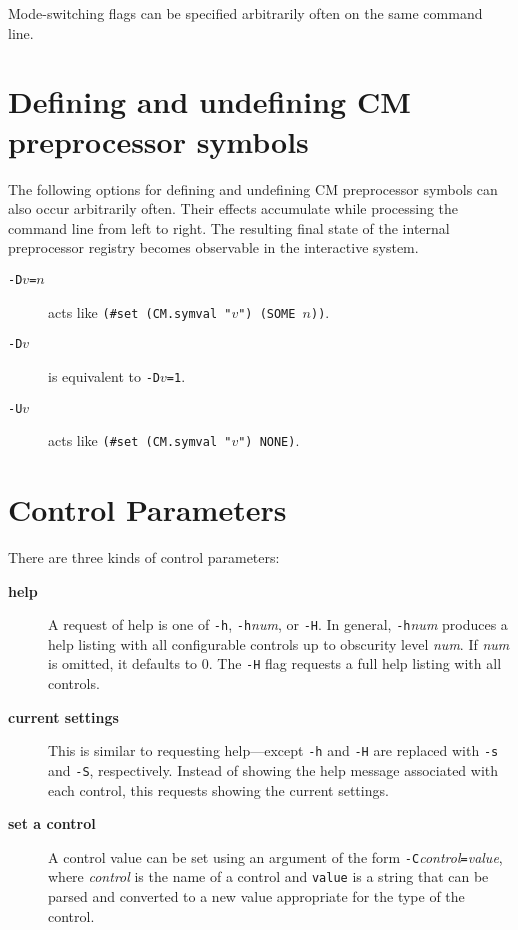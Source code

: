 Mode-switching flags can be specified arbitrarily often on the same
command line.

\section{Defining and undefining CM preprocessor symbols}
\label{sec:cmdline:defundef}

The following options for defining and undefining CM preprocessor
symbols can also occur arbitrarily often.  Their effects accumulate
while processing the command line from left to right.  The resulting
final state of the internal preprocessor registry becomes observable
in the interactive system.

\begin{description}
\item[{\tt -D$v$=$n$}] acts like {\tt (\#set (CM.symval "$v$") (SOME $n$))}.
\item[{\tt -D$v$}] is equivalent to {\tt -D$v$=1}.
\item[{\tt -U$v$}] acts like {\tt (\#set (CM.symval "$v$") NONE)}.
\end{description}

\section{Control Parameters}

There are three kinds of control parameters:

\begin{description}
\item[{\bf help}] A request of help is one of {\tt -h},
{\tt -h}{\it num}, or {\tt -H}.  In general, {\tt -h}{\it num}
produces a help listing with all configurable controls up to obscurity
level {\it num}.  If {\it num} is omitted, it defaults to 0.  The
{\tt -H} flag requests a full help listing with all controls.
\item[{\bf current settings}] This is similar to requesting
help---except {\tt -h} and {\tt -H} are replaced with {\tt -s} and
{\tt -S}, respectively.  Instead of showing the help message
associated with each control, this requests showing the current
settings.
\item[{\bf set a control}] A control value can be set using an
argument of the form {\tt -C}{\it control}{\tt =}{\it value}, where
{\it control} is the name of a control and {\tt value} is a string
that can be parsed and converted to a new value appropriate for the
type of the control.
\end{description}
